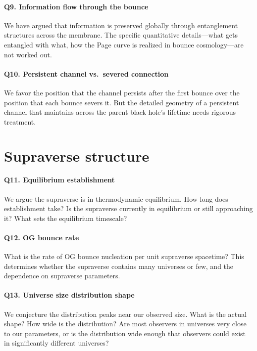 \paragraph{Q9. Information flow through the bounce}
We have argued that information is preserved globally through entanglement
structures across the membrane. The specific quantitative details---what gets
entangled with what, how the Page curve is realized in bounce cosmology---are not
worked out.

\paragraph{Q10. Persistent channel vs.\ severed connection}
We favor the position that the channel persists after the first bounce over the
position that each bounce severs it. But the detailed geometry of a persistent
channel that maintains across the parent black hole's lifetime needs rigorous
treatment.

\section{Supraverse structure}

\paragraph{Q11. Equilibrium establishment}
We argue the supraverse is in thermodynamic equilibrium. How long does
establishment take? Is the supraverse currently in equilibrium or still
approaching it? What sets the equilibrium timescale?

\paragraph{Q12. OG bounce rate}
What is the rate of OG bounce nucleation per unit supraverse spacetime? This
determines whether the supraverse contains many universes or few, and the
dependence on supraverse parameters.

\paragraph{Q13. Universe size distribution shape}
We conjecture the distribution peaks near our observed size. What is the actual
shape? How wide is the distribution? Are most observers in universes very close
to our parameters, or is the distribution wide enough that observers could exist
in significantly different universes?

